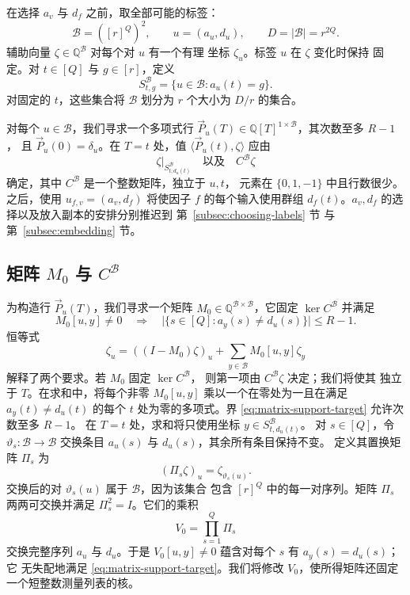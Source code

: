 \documentclass[11pt,reqno]{amsart}
\numberwithin{equation}{section}
\theoremstyle{definition}\newtheorem{definition}[theorem]{定义}
\theoremstyle{remark}\newtheorem{remark}[theorem]{注}
\renewcommand{\le}{\leqslant}
\begin{document}
在选择 $a_v$ 与 $d_f$ 之前，取全部可能的标签：
\begin{equation}\label{eq:auxiliary-labels}
 \mathcal B=([r]^Q)^2,\qquad u=(a_u,d_u),\qquad D=|\mathcal B|=r^{2Q}.
\end{equation}
辅助向量 $\zeta\in\mathbb Q^{\mathcal B}$ 对每个对 $u$ 有一个有理
坐标 $\zeta_u$。标签 $u$ 在 $\zeta$ 变化时保持
固定。对 $t\in[Q]$ 与 $g\in[r]$，定义
\begin{equation}\label{eq:auxiliary-groups}
 S^{\mathcal B}_{t,g}=\{u\in\mathcal B:a_u(t)=g\}.
\end{equation}
对固定的 $t$，这些集合将 $\mathcal B$ 划分为 $r$ 个大小为 $D/r$ 的集合。

对每个 $u\in\mathcal B$，我们寻求一个多项式行
$\vec{P}_u(T)\in\mathbb Q[T]^{1\times\mathcal B}$，其次数至多 $R-1$，
且 $\vec{P}_u(0)=\delta_u$。在 $T=t$ 处，值 $\langle \vec{P}_u(t), \zeta\rangle$ 应由
\[
 \zeta|_{S^{\mathcal B}_{t,d_u(t)}}
 \quad\text{以及}\quad C^{\mathcal B}\zeta
\]
确定，其中 $C^{\mathcal B}$ 是一个整数矩阵，独立于 $u,t$，
元素在 $\{0,1,-1\}$ 中且行数很少。之后，使用
$u_{f,v}=(a_v,d_f)$ 将使因子 $f$ 的每个输入使用群组
$d_f(t)$。$a_v,d_f$ 的选择以及放入副本的安排分别推迟到
第~\ref{subsec:choosing-labels} 节
与第~\ref{subsec:embedding} 节。

\subsection{矩阵 $M_0$ 与 $C^{\mathcal B}$}
为构造行 $\vec{P}_u(T)$，我们寻求一个矩阵
$M_0\in\mathbb Q^{\mathcal B\times\mathcal B}$，它固定
$\ker C^{\mathcal B}$ 并满足
\begin{equation}\label{eq:matrix-support-target}
 M_0[u,y]\ne0\quad\Longrightarrow\quad
 \bigl|\{s\in[Q]:a_y(s)\ne d_u(s)\}\bigr|\le R-1.
\end{equation}
恒等式
\begin{equation}\label{eq:coordinate-decomposition}
 \zeta_u=((I-M_0)\zeta)_u+
          \sum_{y\in\mathcal B}M_0[u,y]\zeta_y
\end{equation}
解释了两个要求。若 $M_0$ 固定 $\ker C^{\mathcal B}$，
则第一项由 $C^{\mathcal B}\zeta$ 决定；我们将使其
独立于 $T$。在求和中，将每个非零
$M_0[u,y]$ 乘以一个在零处为一且在满足 $a_y(t)\ne d_u(t)$ 的每个
$t$ 处为零的多项式。界
\eqref{eq:matrix-support-target} 允许次数至多 $R-1$。
在 $T=t$ 处，求和将只使用坐标
$y\in S^{\mathcal B}_{t,d_u(t)}$。
对 $s\in[Q]$，令 $\vartheta_s:\mathcal B\to\mathcal B$ 交换条目 $a_u(s)$
与 $d_u(s)$，其余所有条目保持不变。
定义其置换矩阵 $\Pi_s$ 为
\[
 (\Pi_s\zeta)_u=\zeta_{\vartheta_s(u)}.
\]
交换后的对 $\vartheta_s(u)$ 属于 $\mathcal B$，因为该集合
包含 $[r]^Q$ 中的每一对序列。矩阵 $\Pi_s$
两两可交换并满足 $\Pi_s^2=I$。它们的乘积
\[
 V_0=\prod_{s=1}^Q\Pi_s
\]
交换完整序列 $a_u$ 与 $d_u$。于是
$V_0[u,y]\ne0$ 蕴含对每个 $s$ 有 $a_y(s)=d_u(s)$；它
无失配地满足
\eqref{eq:matrix-support-target}。我们将修改
$V_0$，使所得矩阵还固定一个短整数测量列表的核。
\end{document}

